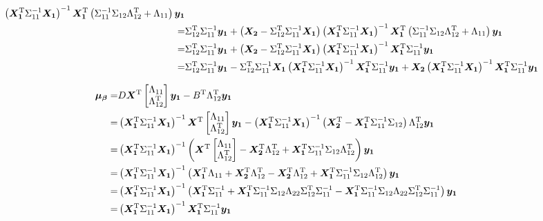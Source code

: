 \documentclass[twoside]{article}
\begin{document}
\begin{align*}
\left(\bm{X_1}^\mathrm{T}\Sigma_{11}^{-1}\bm{X_1}\right)^{-1}
\bm{X_1}^\mathrm{T}\left(
    \Sigma_{11}^{-1}\Sigma_{12} 
     \Lambda_{12}^\mathrm{T}
     +
   \Lambda_{11}  
\right)
\bm{y_1}
\\
=&
\Sigma_{12}^\mathrm{T}\Sigma_{11}^{-1}\bm{y_1}
+\left(
   \bm{X_2} -  \Sigma_{12}^\mathrm{T}\Sigma_{11}^{-1} 
\bm{X_1}\right)
\left(\bm{X_1}^\mathrm{T}\Sigma_{11}^{-1}\bm{X_1}\right)^{-1}
\bm{X_1}^\mathrm{T}\left(
    \Sigma_{11}^{-1}\Sigma_{12} 
     \Lambda_{12}^\mathrm{T}
     +
   \Lambda_{11}  
\right)
\bm{y_1}
\\
=&
\Sigma_{12}^\mathrm{T}\Sigma_{11}^{-1}\bm{y_1}
+\left(
   \bm{X_2} -  \Sigma_{12}^\mathrm{T}\Sigma_{11}^{-1} 
\bm{X_1}\right)
\left(\bm{X_1}^\mathrm{T}\Sigma_{11}^{-1}\bm{X_1}\right)^{-1}
\bm{X_1}^\mathrm{T}
    \Sigma_{11}^{-1}
\bm{y_1}
\\
=&
\Sigma_{12}^\mathrm{T}\Sigma_{11}^{-1}\bm{y_1}
-  \Sigma_{12}^\mathrm{T}\Sigma_{11}^{-1} 
\bm{X_1}
\left(\bm{X_1}^\mathrm{T}\Sigma_{11}^{-1}\bm{X_1}\right)^{-1}
\bm{X_1}^\mathrm{T}
    \Sigma_{11}^{-1}
\bm{y_1}
+
\bm{X_2}\left(\bm{X_1}^\mathrm{T}\Sigma_{11}^{-1}\bm{X_1}\right)^{-1}
\bm{X_1}^\mathrm{T}
    \Sigma_{11}^{-1}
\bm{y_1}
\end{align*}


\begin{align*}
\bm{\mu_\beta}
=&
    D \bm{X}^\mathrm{T}
    \begin{bmatrix}
        \Lambda_{11}\\
        \Lambda_{12}^\mathrm{T}
    \end{bmatrix}
    \bm{y_1}
    - B^\mathrm{T} \Lambda_{12}^\mathrm{T}\bm{y_1}
\\
=&
\left(\bm{X_1}^\mathrm{T}\Sigma_{11}^{-1}\bm{X_1}\right)^{-1}
\bm{X}^\mathrm{T}
    \begin{bmatrix}
        \Lambda_{11}\\
        \Lambda_{12}^\mathrm{T}
    \end{bmatrix}
    \bm{y_1}
-
\left(\bm{X_1}^\mathrm{T}\Sigma_{11}^{-1}\bm{X_1}\right)^{-1}\left(
\bm{X_2}^\mathrm{T}
-
\bm{X_1}^\mathrm{T}
\Sigma_{11}^{-1}
\Sigma_{12}
\right)
 \Lambda_{12}^\mathrm{T}\bm{y_1}
\\
=&
\left(\bm{X_1}^\mathrm{T}\Sigma_{11}^{-1}\bm{X_1}\right)^{-1}
\left(
\bm{X}^\mathrm{T}
    \begin{bmatrix}
        \Lambda_{11}\\
        \Lambda_{12}^\mathrm{T}
    \end{bmatrix}
-
\bm{X_2}^\mathrm{T} \Lambda_{12}^\mathrm{T}
+
\bm{X_1}^\mathrm{T}
\Sigma_{11}^{-1}
\Sigma_{12}
 \Lambda_{12}^\mathrm{T}
 \right)\bm{y_1}
 \\
=&
\left(\bm{X_1}^\mathrm{T}\Sigma_{11}^{-1}\bm{X_1}\right)^{-1}
\left(
\bm{X_1}^\mathrm{T}\Lambda_{11}
+
\bm{X_2}^\mathrm{T}\Lambda_{12}^\mathrm{T}
-
\bm{X_2}^\mathrm{T} \Lambda_{12}^\mathrm{T}
+
\bm{X_1}^\mathrm{T}
\Sigma_{11}^{-1}
\Sigma_{12}
 \Lambda_{12}^\mathrm{T}
 \right)\bm{y_1}
\\
=&
\left(\bm{X_1}^\mathrm{T}\Sigma_{11}^{-1}\bm{X_1}\right)^{-1}
\left(
\bm{X_1}^\mathrm{T}\Sigma_{11}^{-1}
+
\bm{X_1}^\mathrm{T}\Sigma_{11}^{-1}\Sigma_{12}\Lambda_{22}\Sigma_{12}^\mathrm{T}\Sigma_{11}^{-1}
-
\bm{X_1}^\mathrm{T}
\Sigma_{11}^{-1}
\Sigma_{12}
\Lambda_{22}
 \Sigma_{12}^\mathrm{T}
 \Sigma_{11}^{-1}
 \right)\bm{y_1}
\\
=&
\left(\bm{X_1}^\mathrm{T}\Sigma_{11}^{-1}\bm{X_1}\right)^{-1}
\bm{X_1}^\mathrm{T}\Sigma_{11}^{-1}
\bm{y_1}
\end{align*}
\end{document}
